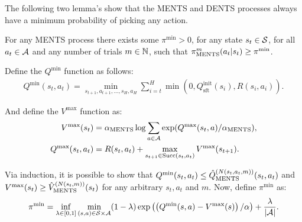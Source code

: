        
        The following two lemma's show that the MENTS and DENTS processes always have a minimum probability of picking any action. 
        \begin{lemma} \label{lem:min_prob_ments}
            For any MENTS process there exists some $\pi^{\min}>0$, for any state $s_t\in\mathcal{S}$, for all $a_t\in\mathcal{A}$ and any number of trials $m\in\mathbb{N}$, such that ${\pi^{m}_{{\textnormal{MENTS}}}}(a_t|s_t)\geq\pi^{\min}$.
        \end{lemma}
        \begin{proofoutline}
            Define the $Q^{\min}$ function as follows:
            \begin{align}
                Q^{\min}(s_t,a_t) = \min_{s_{t+1},a_{t+1},...,s_H,a_H} \sum_{i=t}^H \min(0, Q^{\text{init}}_{\text{sft}}(s_i), R(s_i,a_i)).
            \end{align}
            
            And define the $V^{\max}$ function as:
            \begin{align}
                V^{\max}(s_t) &= {\alpha_{{\textnormal{MENTS}}}} \log \sum_{a\in\mathcal{A}} \exp (Q^{\max}(s_t,a)/{\alpha_{{\textnormal{MENTS}}}}), \label{appeq:vmax} \\
                Q^{\max}(s_t,a_t) &= R(s_t,a_t)+\max_{s_{t+1}\in{\textnormal{Succ}(s_t,a_t)}} V^{\max}(s_{t+1}).
            \end{align}
            
            Via induction, it is possible to show that $Q^{\min}(s_t,a_t)\leq {\hat{Q}^{(N(s_t,a_t,m))}_{{\textnormal{MENTS}}}}(s_t,a_t)$ and $V^{\max}(s_t)\geq {\hat{V}^{(N(s_t,m))}_{{\textnormal{MENTS}}}}(s_t)$ for any arbitrary $s_t,a_t$ and $m$. Now, define $\pi^{\min}$ as:
            \begin{align}
                \pi^{\min} = \inf_{\lambda\in[0,1]} \min_{(s,a)\in\mathcal{S}\times\mathcal{A}} (1-\lambda) \exp\left(\left(Q^{\min}(s,a)-V^{\max}(s)\right)/\alpha\right) + \frac{\lambda}{|\mathcal{A}|}. \label{eq:pi_min}
            \end{align}
            

\end{proofoutline}
